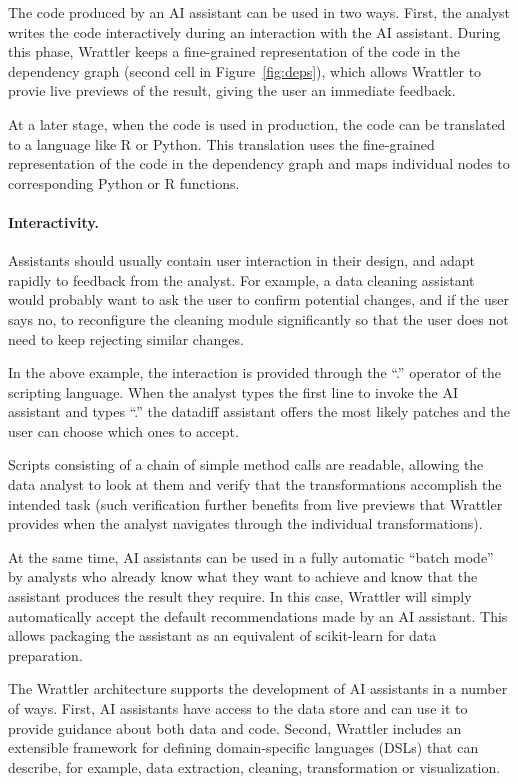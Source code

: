 \documentclass[sigplan,preprint,10pt]{acmart}\settopmatter{printfolios=true,printccs=false,printacmref=false}
\theoremstyle{plain}
\theoremstyle{definition}
\begin{document}
{The code produced by an AI assistant can be used in two ways. First, the analyst writes the code
interactively during an interaction with the AI assistant. During this phase, Wrattler
keeps a fine-grained representation of the code in the dependency graph (second cell in
Figure~\ref{fig:deps}), which allows Wrattler to provie live previews of the result, giving the
user an immediate feedback.

At a later stage, when the code is used in production, the code can be translated to a language
like R or Python. This translation uses the fine-grained representation of the code in the
dependency graph and maps individual nodes to corresponding Python or R functions.

\paragraph{Interactivity.}

Assistants should usually contain user interaction in their design, and adapt rapidly to feedback
from the analyst. For example, a data cleaning assistant would probably want to ask the user to
confirm potential changes, and if the user says no, to reconfigure the cleaning module
significantly so that the user does not need to keep rejecting similar changes.

In the above example, the interaction is provided through the ``.'' operator of the scripting
language. When the analyst types the first line to invoke the AI assistant and types ``.''
the datadiff assistant offers the most likely patches and the user can choose which ones
to accept. 

Scripts consisting of a chain of simple method calls are readable, allowing the data analyst to look at them
and verify that the transformations accomplish the intended task (such verification further
benefits from live previews that Wrattler provides when the analyst navigates through the
individual transformations).

At the same time, AI assistants can be used in a fully automatic ``batch mode'' by analysts
who already know what they want to achieve and know that the assistant produces the result they
require. In this case, Wrattler will simply automatically accept the default recommendations made
by an AI assistant. This allows packaging the assistant as an equivalent of scikit-learn for
data preparation.

\vspace{1em}
\noindent
The Wrattler architecture supports the development of AI assistants in a number of ways. First, AI
assistants have access to the data store and can use it to provide guidance about both data and
code. Second, Wrattler includes an extensible framework for defining domain-specific languages
(DSLs) that can describe, for example, data extraction, cleaning, transformation or visualization.

}
\end{document}
